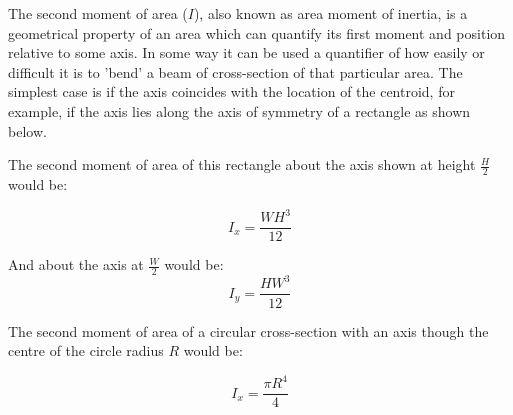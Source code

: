 \documentclass[12pt, letterpaper, twoside]{article}
\begin{document}
The second moment of area ($I$), also known as area moment of inertia, is a geometrical property of an area which can quantify its first moment and position relative to some axis.  In some way it can be used a quantifier of how easily or difficult it is to 'bend' a beam of cross-section of that particular area.  The simplest case is if the axis coincides with the location of the centroid, for example, if the axis lies along the axis of symmetry of a rectangle as shown below. 

\begin{center}
\end{center}

The second moment of area of this rectangle about the axis shown at height $\frac{H}{2}$ would be:

\begin{equation}
I_x=\frac{WH^3}{12}
\end{equation}

And about the axis at $\frac{W}{2}$ would be:
\begin{equation}
I_y=\frac{HW^3}{12}
\end{equation}

The second moment of area of a circular cross-section with an axis though the centre of the circle radius $R$ would be:

\begin{equation}
I_x=\frac{\pi R^4}{4}
\end{equation}
\end{document}

